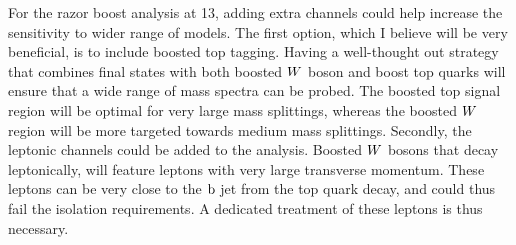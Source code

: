 For the razor boost analysis at 13\TeV, adding extra channels could help increase the sensitivity
to wider range of models. The first option, which I believe will be very beneficial, is to include
boosted top tagging. Having a well-thought out strategy that combines final states with both boosted
$W$ boson and boost top quarks will ensure that a wide range of mass spectra can be probed. The
boosted top signal region will be optimal for very large mass splittings, whereas the boosted $W$
region will be more targeted towards medium mass splittings. 
Secondly, the leptonic channels could be added to the analysis. Boosted $W$ bosons that decay
leptonically, will feature leptons with very large transverse momentum. These leptons can be very
close to the $\mathrm{b}$ jet from the top quark decay, and could thus fail the isolation requirements.
A dedicated treatment of these leptons is thus necessary. 

















